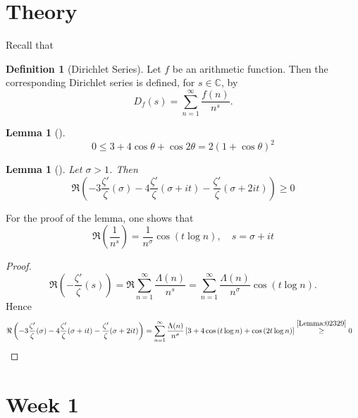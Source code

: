 \documentclass[reqno]{amsart}
\newtheorem{lemma}[theorem]{Lemma}
\theoremstyle{definition}
\newtheorem{definition}[theorem]{Definition}
\theoremstyle{remark}
\begin{document}
\section{Theory}


    Recall that
    \begin{definition}[Dirichlet Series]
        Let $f$ be an arithmetic function. Then the corresponding
        Dirichlet series is defined, for
        $s \in \mathbb{C}$, by
        \[
        D_f (s) = \sum_{n=1}^{\infty} \frac{f(n)}{n^{s}}.
        \] 
    \end{definition}


    \begin{lemma}[]\label{Lemma:02329}
        \[
        0 \le 3 + 4 \cos \theta + \cos 2\theta = 
        2 \left( 1+ \cos \theta \right)^2
        \] 
    \end{lemma}

    \begin{lemma}[]\label{Lemma:39292}
        Let $\sigma > 1$. Then
        \[
        \Re \left( -3 \frac{\zeta '}{\zeta} (\sigma)-
        4 \frac{\zeta'}{\zeta}(\sigma + it)-
    \frac{\zeta'}{\zeta}(\sigma + 2 i t)\right) \ge 0
        \] 
    \end{lemma}

    For the proof of the lemma, one shows that
    \[
    \Re \left( \frac{1}{n^{s}} \right) =
    \frac{1}{n^{\sigma}} \cos \left( t \log n \right) , \quad
    s = \sigma + it \tag{$A_1$} \label{A-1}
    \] 

    \begin{proof}
        \[
        \Re \left( - \frac{\zeta'}{\zeta}(s) \right) 
        = \Re \sum_{n=1}^{\infty} \frac{\Lambda (n)}{n^{s}}
        = \sum_{n=1}^{\infty} \frac{\Lambda(n)}{n^{\sigma}}
        \cos \left( t \log n \right) .
        \] 
        Hence
        \begin{align*}
        \Re \left( -3 \frac{\zeta '}{\zeta} (\sigma)-
        4 \frac{\zeta'}{\zeta}(\sigma + it)-
    \frac{\zeta'}{\zeta}(\sigma + 2 i t)\right) 
    &= \sum_{n=1}^{\infty} \frac{\Lambda(n)}{n^{\sigma}}
    \left[ 3 + 4 \cos \left( t \log n \right) +
    \cos \left( 2t \log n \right) \right] 
    \stackrel{\eqref{Lemma:02329}}{\ge} 0
        \end{align*}
    \end{proof}


\newpage

\section{Week 1}
\end{document}
